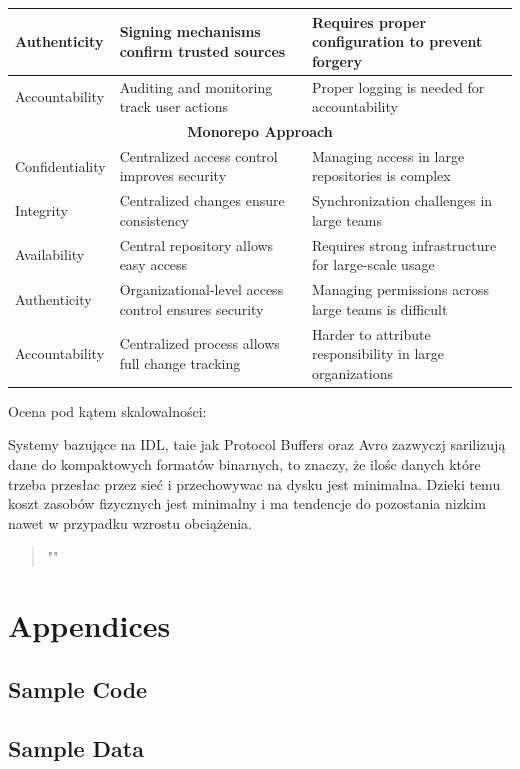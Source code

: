 \documentclass[runningheads,12pt]{llncs}
\begin{document}
\begin{longtable}{|p{4cm}|p{4cm}|p{4cm}|}
Authenticity & Signing mechanisms confirm trusted sources & Requires proper configuration to prevent forgery \\ \hline
Accountability & Auditing and monitoring track user actions & Proper logging is needed for accountability \\ \hline
\multicolumn{3}{|c|}{\textbf{Monorepo Approach}} \\ \hline
Confidentiality & Centralized access control improves security & Managing access in large repositories is complex \\ \hline
Integrity & Centralized changes ensure consistency & Synchronization challenges in large teams \\ \hline
Availability & Central repository allows easy access & Requires strong infrastructure for large-scale usage \\ \hline
Authenticity & Organizational-level access control ensures security & Managing permissions across large teams is difficult \\ \hline
Accountability & Centralized process allows full change tracking & Harder to attribute responsibility in large organizations \\ \hline

\end{longtable}

Ocena pod kątem skalowalności:

Systemy bazujące na IDL, taie jak Protocol Buffers oraz Avro zazwyczj sarilizują dane do kompaktowych formatów binarnych, to znaczy, że ilośc danych które trzeba przesłac przez sieć i przechowywac na dysku jest minimalna. Dzieki temu koszt zasobów fizycznych jest minimalny i ma tendencje do pozostania nizkim nawet w przypadku wzrostu obciążenia. 

\begin{quote}
    "" ~\cite[p. 75]{bloch2018effective}
\end{quote}

\nocite{*}

\listoftables

\listoffigures




\section{Appendices}

\subsection{Sample Code}
\subsection{Sample Data}
\end{document}
